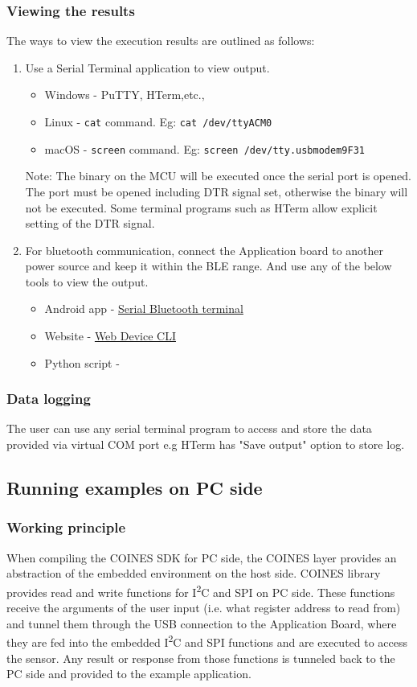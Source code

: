 \documentclass[11pt,headings=small]{scrartcl}
\begin{document}
\subsubsection{Viewing the results}
The ways to view the execution results are outlined as follows:
\begin{enumerate}
	\item Use a Serial Terminal application to view output.
	\begin{itemize}
		\item Windows - PuTTY, HTerm,etc.,
		\item Linux - \texttt{cat} command. Eg: \texttt{cat /dev/ttyACM0}
		\item macOS - \texttt{screen} command. Eg: \texttt{screen /dev/tty.usbmodem9F31}
	\end{itemize}
	Note: The binary on the MCU will be executed once the serial port is opened. The port must be opened including DTR signal set, otherwise the binary will not be executed. Some terminal programs such as HTerm allow explicit setting of the DTR signal.
	\item For bluetooth communication, connect the Application board to another power source and keep it within the BLE range. And use any of the below tools to view the output.
	\begin{itemize}
		\item Android app - \href{https://play.google.com/store/apps/details?id=de.kai_morich.serial_bluetooth_terminal}{Serial Bluetooth terminal}
		\item Website - \href{https://wiki.makerdiary.com/web-device-cli/}{Web Device CLI}
		\item Python script - 
	\end{itemize}
\end{enumerate}

\subsubsection{Data logging}
The user can use any serial terminal program to access and store the data provided via virtual COM port e.g HTerm has "Save output" option to store log.

\subsection{Running examples on PC side}
\subsubsection{Working principle}
When compiling the COINES SDK for PC side, the COINES layer provides an abstraction of the embedded environment on the host side. COINES library provides read and write functions for I\textsuperscript{2}C and SPI on PC side. These functions receive the arguments of the user input (i.e. what register address to read from) and tunnel them through the USB connection to the Application Board, where they are fed into the embedded I\textsuperscript{2}C and SPI functions and are executed to access the sensor. Any result or response from those functions is tunneled back to the PC side and provided to the example application.
\end{document}
